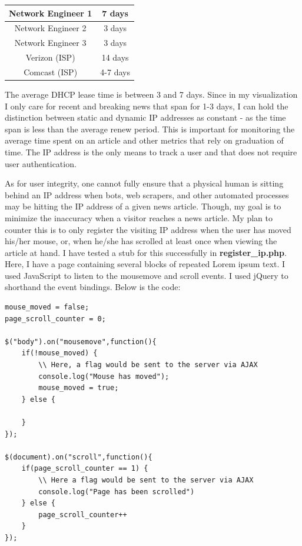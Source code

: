 \documentclass[12pt]{article}
\begin{document}
\begin{tabular}{| c | c |}
  \hline                       
  Network Engineer 1 & 7 days \\[1ex] \hline
  Network Engineer 2 & 3 days \\[1ex] \hline
  Network Engineer 3 & 3 days \\ [1ex] \hline
  Verizon (ISP) & 14 days \\[1ex] \hline
  Comcast (ISP) & 4-7 days \\[1ex]
  \hline  
\end{tabular}
\vspace{0.3in}

The average DHCP lease time is between 3 and 7 days. Since in my visualization I only care for recent and breaking news that span for 1-3 days, I can hold the distinction between static and dynamic IP addresses as constant - as the time span is less than the average renew period. This is important for monitoring the average time spent on an article and other metrics that rely on graduation of time. The IP address is the only means to track a user and that does not require user authentication. 

As for user integrity, one cannot fully ensure that a physical human is sitting behind an IP address when bots, web scrapers, and other automated processes may be hitting the IP address of a given news article. Though, my goal is to minimize the inaccuracy when a visitor reaches a news article. My plan to counter this is to only register the visiting IP address when the user has moved his/her mouse, or, when he/she has scrolled at least once when viewing the article at hand. I have tested a stub for this successfully in \textbf{register\_ip.php}. Here, I have a page containing several blocks of repeated Lorem ipsum text. I used JavaScript to listen to the mousemove and scroll events. I used jQuery to shorthand the event bindings. Below is the code:
\begin{lstlisting}
mouse_moved = false;
page_scroll_counter = 0;

$("body").on("mousemove",function(){
	if(!mouse_moved) {
		\\ Here, a flag would be sent to the server via AJAX
		console.log("Mouse has moved");
		mouse_moved = true;
	} else {
		
	}
});

$(document).on("scroll",function(){
	if(page_scroll_counter == 1) {
		\\ Here a flag would be sent to the server via AJAX
		console.log("Page has been scrolled")
	} else {
		page_scroll_counter++
	}
});
\end{lstlisting}        
\end{document}
